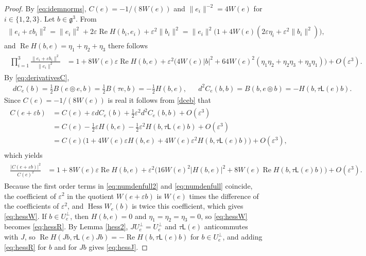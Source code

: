 \documentclass [leqno, 10pt]{amsart}
\theoremstyle{definition}
\numberwithin{equation}{section}
\newcommand{\tmlt}{\circledcirc}
\newcommand{\hess}{\operatorname{Hess}}
\newcommand{\lin}{\mathsf{L}}
\newcommand{\re}{\operatorname{Re}}
\newcommand{\g}{\mathfrak{g}}
\newcommand{\norm}[1]{\lVert #1\rVert}
\newcommand{\nnorm}[1]{\lvert #1\rvert}%
\newcommand{\Usp}{U}
\newcommand{\Uperp}{\Usp^{\perp}}
\begin{document}
\begin{proof}
By \eqref{eq:idemnorms}, $C(e) = -1/(8W(e))$ and $\norm{e_{i}}^{-2} = 4W(e)$ for $i \in \{1, 2, 3\}$. Let $b \in \g^{3}$. From
\begin{align}
\norm{e_{i} + \varepsilon b_{i}}^{2} = \norm{e_{i}}^{2} + 2\varepsilon\re H(b_{i}, e_{i}) + \varepsilon^{2}\norm{b_{i}}^{2} = \norm{e_{i}}^{2}\big(1 + 4W(e)(2\varepsilon\eta_{i} + \varepsilon^{2}\norm{b_{i}}^{2})\big), 
\end{align}
and $\re H(b, e) = \eta_{1} + \eta_{2} + \eta_{3}$ there follows
\begin{align}\label{eq:numdenfull2}
\begin{aligned}
\prod_{i=1}^{3}\frac{\norm{e_{i} + \varepsilon b_{i}}^{2}}{\norm{e_{i}}^{2}} &= 1 + 8W(e)\varepsilon\re H(b, e) + \varepsilon^{2}\Big(4W(e)\nnorm{b}^{2} + 64W(e)^{2}(\eta_{1}\eta_{2} + \eta_{2}\eta_{3} + \eta_{3}\eta_{1})\Big) + O(\varepsilon^{3}).
\end{aligned}
\end{align}
By \eqref{eq:derivativesC}, 
\begin{align}\label{dceb}
&dC_{e}(b) = \tfrac{1}{2}B(e\tmlt e, b) = \tfrac{1}{2}B(\tau e, b) = -\tfrac{1}{2}H(b, e), &&d^{2}C_{e}(b, b) = B(b, e\tmlt b) = -H(b, \tau\lin(e)b). 
\end{align}
Since $C(e)= -1/(8W(e))$ is real it follows from \eqref{dceb} that 
\begin{align}
\begin{aligned}
C(e + \varepsilon b) &=C(e) +\varepsilon dC_{e}(b) + \tfrac{1}{2}\varepsilon^{2}d^{2}C_{e}(b, b) + O(\varepsilon^{3})\\
& = C(e) - \tfrac{1}{2}\varepsilon H(b, e) - \tfrac{1}{2}\varepsilon^{2}H(b, \tau\lin(e)b) + O(\varepsilon^{3})\\
&= C(e)\big(1 + 4W(e)\varepsilon H(b, e) + 4W(e)\varepsilon^{2}H(b, \tau\lin(e)b)\big) + O(\varepsilon^{3}),
\end{aligned}
\end{align}
which yields
\begin{align}\label{eq:numdenfull}
\begin{aligned}
\frac{|C(e + \varepsilon b)|^{2}}{C(e)^{2}} &= 1 + 8W(e)\varepsilon\re H(b, e) + \varepsilon^{2}\Big(16W(e)^{2}|H(b, e)|^{2} + 8W(e)\re H(b, \tau\lin(e)b)\Big) + O(\varepsilon^{3}).
\end{aligned}
\end{align}
Because the first order terms in \eqref{eq:numdenfull2} and \eqref{eq:numdenfull} coincide, the coefficient of $\varepsilon^{2}$ in the quotient $W(e + \varepsilon b)$ is $W(e)$ times the difference of the coefficients of $\varepsilon^{2}$, and $\hess W_{e}(b)$ is twice this coefficient, which gives \eqref{eq:hessW}. If $b \in \Uperp_{e}$, then $H(b, e) = 0$ and $\eta_{1} = \eta_{2} = \eta_{3} = 0$, so \eqref{eq:hessW} becomes \eqref{eq:hessR}. By Lemma \ref{hess2}, $J\Uperp_{e} = \Uperp_{e}$ and $\tau\lin(e)$ anticommutes with $J$, so $\re H(Jb, \tau\lin(e)Jb) = -\re H(b, \tau\lin(e)b)$ for $b \in \Uperp_{e}$, and adding \eqref{eq:hessR} for $b$ and for $Jb$ gives \eqref{eq:hessJ}.


\end{proof}
\end{document}
